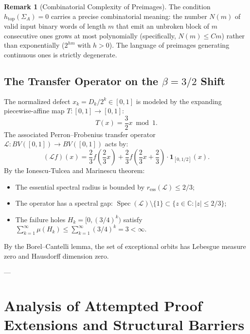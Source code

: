 \documentclass[11pt,reqno]{amsart}
\theoremstyle{definition}
\newtheorem{remark}[theorem]{Remark}
\numberwithin{equation}{section}
\begin{document}
\begin{remark}[Combinatorial Complexity of Preimages]
The condition $h_{\mathrm{top}}(\Sigma_A) = 0$ carries a precise combinatorial meaning: the number $N(m)$ of valid input binary words of length $m$ that emit an unbroken block of $m$ consecutive ones grows at most polynomially (specifically, $N(m) \le C m$) rather than exponentially ($2^{h m}$ with $h > 0$). The language of preimages generating continuous ones is strictly degenerate.
\end{remark}

\subsection{\texorpdfstring{The Transfer Operator on the $\beta = 3/2$ Shift}{The Transfer Operator on the beta = 3/2 Shift}}
The normalized defect $x_k = D_k / 2^k \in [0, 1]$ is modeled by the expanding piecewise-affine map $T : [0, 1] \to [0, 1]$:
\[
T(x) = \frac{3}{2} x \bmod 1.
\]
The associated Perron--Frobenius transfer operator $\mathcal{L} : BV([0, 1]) \to BV([0, 1])$ acts by:
\[
(\mathcal{L} f)(x) = \frac{2}{3} f\left(\frac{2}{3} x\right) + \frac{2}{3} f\left(\frac{2}{3} x + \frac{2}{3}\right) \cdot \mathbf{1}_{[0, 1/2]}(x).
\]
By the Ionescu-Tulcea and Marinescu theorem:
\begin{itemize}
    \item The essential spectral radius is bounded by $r_{\mathrm{ess}}(\mathcal{L}) \le 2/3$;
    \item The operator has a spectral gap: $\operatorname{Spec}(\mathcal{L}) \setminus \{1\} \subset \{z \in \mathbb{C} : |z| \le 2/3\}$;
    \item The failure holes $H_k = [0, (3/4)^k)$ satisfy $\sum_{k=1}^\infty \mu(H_k) \le \sum_{k=1}^\infty (3/4)^k = 3 < \infty$.
\end{itemize}
By the Borel--Cantelli lemma, the set of exceptional orbits has Lebesgue measure zero and Hausdorff dimension zero.

---

\section{Analysis of Attempted Proof Extensions and Structural Barriers}
\end{document}
